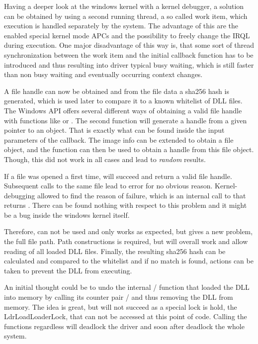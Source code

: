 Having a deeper look at the windows kernel with a kernel debugger, a solution can be obtained by using a second running thread, a so called work item, which execution is handled separately by the system. The advantage of this are the enabled special kernel mode \glspl{APC} and the possibility to freely change the \gls{IRQL} during execution. One major disadvantage of this way is, that some sort of thread synchronization between the work item and the initial callback function has to be introduced and thus resulting into driver typical busy waiting, which is still faster than non busy waiting and eventually occurring context changes. 

A file handle can now be obtained and from the file data a sha256 \cite{eckert2014sicherheit} hash is generated, which is used later to compare it to a known whitelist of \gls{DLL} files. The Windows \gls{API} offers several different ways of obtaining a valid file handle with functions like  or . The second function  will generate a handle from a given pointer to an object. That is exactly what can be found inside the input parameters of the  callback. The image info can be extended to obtain a file object, and the  function can then be used to obtain a handle from this file object. Though, this did not work in all cases and lead to \emph{random} results. 

If a file was opened a first time,  will succeed and return a valid file handle. Subsequent calls to the same file lead to error  for no obvious reason. Kernel-debugging allowed to find the reason of failure, which is an internal call to  that returns . There can be found nothing with respect to this problem and it might be a bug inside the windows kernel itself. 

Therefore,  can not be used and only  works as expected, but gives a new problem, the full file path. Path constructions is required, but will overall work and allow reading of all loaded \gls{DLL} files. Finally, the resulting sha256 hash can be calculated and compared to the whitelist and if no match is found, actions can be taken to prevent the \gls{DLL} from executing. 

An initial thought could be to undo the internal / function that loaded the \gls{DLL} into memory by calling its counter pair / and thus removing the \gls{DLL} from memory. The idea is great, but will not succeed as a special lock is hold, the LdrLoadLoaderLock, that can not be accessed at this point of code. Calling the functions regardless will deadlock the driver and soon after deadlock the whole system.

